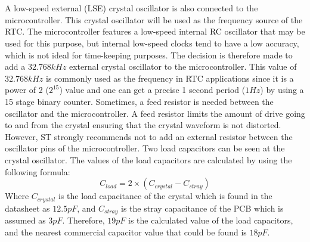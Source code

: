 \\
\\
A low-speed external (LSE) crystal oscillator is also connected to the microcontroller. This crystal oscillator will be used as the frequency source of the RTC. The microcontroller features a low-speed internal RC oscillator that may be used for this purpose, but internal low-speed clocks tend to have a low accuracy, which is not ideal for time-keeping purposes. The decision is therefore made to add a $ 32.768 kHz $ external crystal oscillator to the microcontroller. This value of $ 32.768 kHz $ is commonly used as the frequency in RTC applications since it is a power of 2 ($ 2^{15} $) value and one can get a precise 1 second period ($ 1 Hz $) by using a 15 stage binary counter. Sometimes, a feed resistor is needed between the oscillator and the microcontroller. A feed resistor limits the amount of drive going to and from the crystal ensuring that the crystal waveform is not distorted. However, ST strongly recommends not to add an external resistor between the oscillator pins of the microcontroller. Two load capacitors can be seen at the crystal oscillator. The values of the load capacitors are calculated by using the following formula:
\begin{equation}
C_{load} = 2 \times (C_{crystal} - C_{stray})
\end{equation}
\noindent
Where $ C_{crystal} $ is the load capacitance of the crystal which is found in the datasheet as $ 12.5 pF $, and $ C_{stray} $ is the stray capacitance of the PCB which is assumed as $ 3 pF $. Therefore, $ 19 pF $ is the calculated value of the load capacitors, and the nearest commercial capacitor value that could be found is $ 18 pF $.

